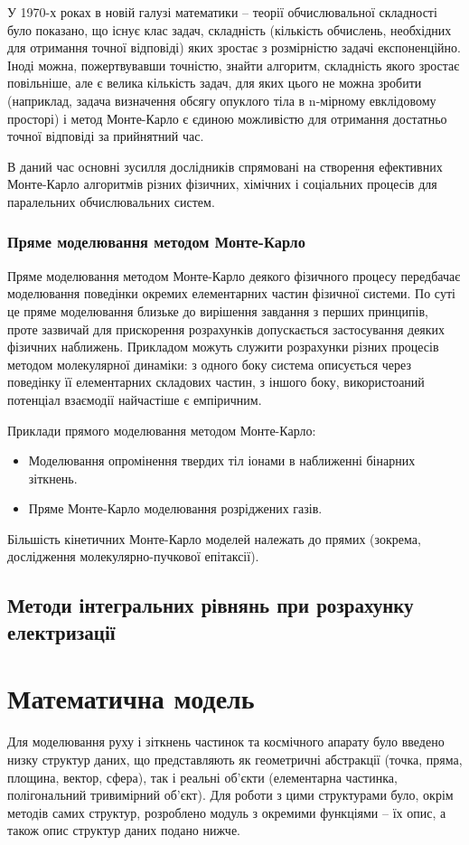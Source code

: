 \documentclass[a4paper,12pt]{article}
\begin{document}
У 1970-х роках в новій галузі математики -- теорії обчислювальної складності було показано, що існує клас задач, складність (кількість обчислень, необхідних для отримання точної відповіді) яких зростає з розмірністю задачі експоненційно. Іноді можна, пожертвувавши точністю, знайти алгоритм, складність якого зростає повільніше, але є велика кількість задач, для яких цього не можна зробити (наприклад, задача визначення обсягу опуклого тіла в n-мірному евклідовому просторі) і метод Монте-Карло є єдиною можливістю для отримання достатньо точної відповіді за прийнятний час.

В даний час основні зусилля дослідників спрямовані на створення ефективних Монте-Карло алгоритмів різних фізичних, хімічних і соціальних процесів для паралельних обчислювальних систем.

\subsubsection{Пряме моделювання методом Монте-Карло}
Пряме моделювання методом Монте-Карло деякого фізичного процесу передбачає моделювання поведінки окремих елементарних частин фізичної системи. По суті це пряме моделювання близьке до вирішення завдання з перших принципів, проте зазвичай для прискорення розрахунків допускається застосування деяких фізичних наближень. Прикладом можуть служити розрахунки різних процесів методом молекулярної динаміки: з одного боку система описується через поведінку її елементарних складових частин, з іншого боку, використоаний потенціал взаємодії найчастіше є емпіричним.

Приклади прямого моделювання методом Монте-Карло:
\renewcommand{\labelitemi}{$\circ$}
\begin{itemize}
\item Моделювання опромінення твердих тіл іонами в наближенні бінарних зіткнень.
\item Пряме Монте-Карло моделювання розріджених газів.
\end{itemize}
Більшість кінетичних Монте-Карло моделей належать до прямих (зокрема, дослідження молекулярно-пучкової епітаксії).

\subsection{Методи інтегральних рівнянь при розрахунку електризації}

\newpage

\section{Математична модель}
Для моделювання руху і зіткнень частинок та космічного апарату було введено низку структур даних, що представляють як геометричні абстракції (точка, пряма, площина, вектор, сфера), так і реальні об’єкти (елементарна частинка, полігональний тривимірний об’єкт). Для роботи з цими структурами було, окрім методів самих структур, розроблено модуль з окремими функціями -- їх опис, а також опис структур даних подано нижче.
\end{document}
